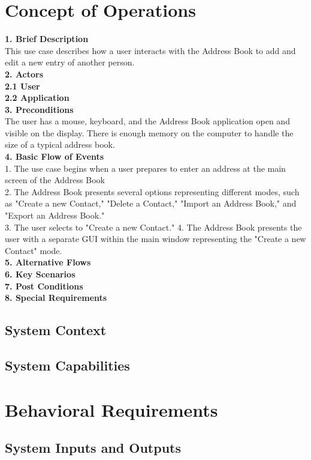 \documentclass[a4paper, 11pt]{article}
\newcommand\tab[1][1cm]{\hspace*{#1}}
\begin{document}
\section{Concept of Operations}
\large \textbf{1. Brief Description}\\
This use case describes how a user interacts with the Address Book to add and edit a new entry of another person. \\
\large \textbf{2. Actors}\\
\tab \large  \textbf{2.1 User}\\
\tab \large  \textbf{2.2 Application}\\
\large \textbf{3. Preconditions}\\
The user has a mouse, keyboard, and the Address Book application open and visible on the display. There is enough memory on the computer to handle the size of a typical address book.\\
\large \textbf{4. Basic Flow of Events}\\
1. The use case begins when a user prepares to enter an address at the main screen of the Address Book\\
2. The Address Book presents several options representing different modes, such as "Create a new Contact," "Delete a Contact," "Import an Address Book," and "Export an Address Book."\\ 
3. The user selects to "Create a new Contact."
4. The Address Book presents the user with a separate GUI within the main window representing the "Create a new Contact" mode.\\
\large \textbf{5. Alternative Flows}\\
\large \textbf{6. Key Scenarios}\\
\large \textbf{7. Post Conditions}\\
\large \textbf{8. Special Requirements}\\


\subsection{System Context}
\subsection{System Capabilities}

\section{Behavioral Requirements}
\subsection{System Inputs and Outputs}
\end{document}
